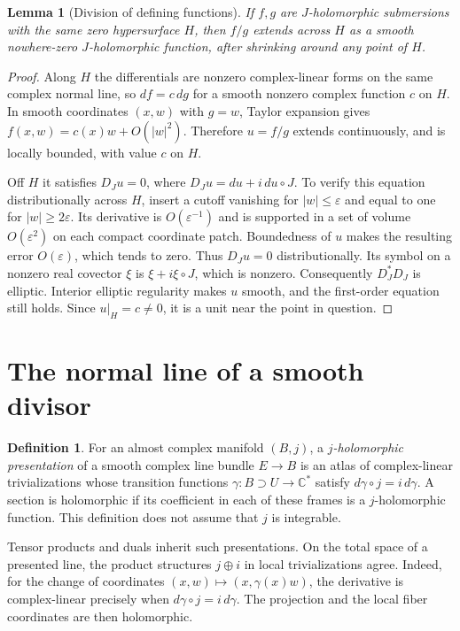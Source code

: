 \documentclass[11pt]{article}
\newtheorem{lemma}[theorem]{Lemma}
\theoremstyle{definition}
\newtheorem{definition}[theorem]{Definition}
\theoremstyle{remark}
\newcommand{\C}{\mathbb C}
\begin{document}
\begin{lemma}[Division of defining functions]\label{lem:division}
If $f,g$ are $J$-holomorphic submersions with the same zero hypersurface $H$, then $f/g$ extends across $H$ as a smooth nowhere-zero $J$-holomorphic function, after shrinking around any point of $H$.
\end{lemma}
\begin{proof}
Along $H$ the differentials are nonzero complex-linear forms on the same complex normal line, so $df=c\,dg$ for a smooth nonzero complex function $c$ on $H$. In smooth coordinates $(x,w)$ with $g=w$, Taylor expansion gives
$f(x,w)=c(x)w+O(|w|^2)$. Therefore $u=f/g$ extends continuously, and is locally bounded, with value $c$ on $H$.

Off $H$ it satisfies $D_Ju=0$, where $D_Ju=du+i\,du\circ J$. To verify this equation distributionally across $H$, insert a cutoff vanishing for $|w|\leq\varepsilon$ and equal to one for $|w|\geq2\varepsilon$. Its derivative is $O(\varepsilon^{-1})$ and is supported in a set of volume $O(\varepsilon^2)$ on each compact coordinate patch. Boundedness of $u$ makes the resulting error $O(\varepsilon)$, which tends to zero. Thus $D_Ju=0$ distributionally. Its symbol on a nonzero real covector $\xi$ is $\xi+i\xi\circ J$, which is nonzero. Consequently $D_J^*D_J$ is elliptic. Interior elliptic regularity makes $u$ smooth, and the first-order equation still holds. Since $u|_H=c\ne0$, it is a unit near the point in question.
\end{proof}

\section{The normal line of a smooth divisor}\label{sec:normal}

\begin{definition}
For an almost complex manifold $(B,j)$, a \emph{$j$-holomorphic presentation} of a smooth complex line bundle $E\to B$ is an atlas of complex-linear trivializations whose transition functions $\gamma:B\supset U\to\C^*$ satisfy $d\gamma\circ j=i\,d\gamma$. A section is holomorphic if its coefficient in each of these frames is a $j$-holomorphic function. This definition does not assume that $j$ is integrable.
\end{definition}
Tensor products and duals inherit such presentations. On the total space of a presented line, the product structures $j\oplus i$ in local trivializations agree. Indeed, for the change of coordinates
$(x,w)\mapsto(x,\gamma(x)w)$, the derivative is complex-linear precisely when $d\gamma\circ j=i\,d\gamma$. The projection and the local fiber coordinates are then holomorphic.
\end{document}
